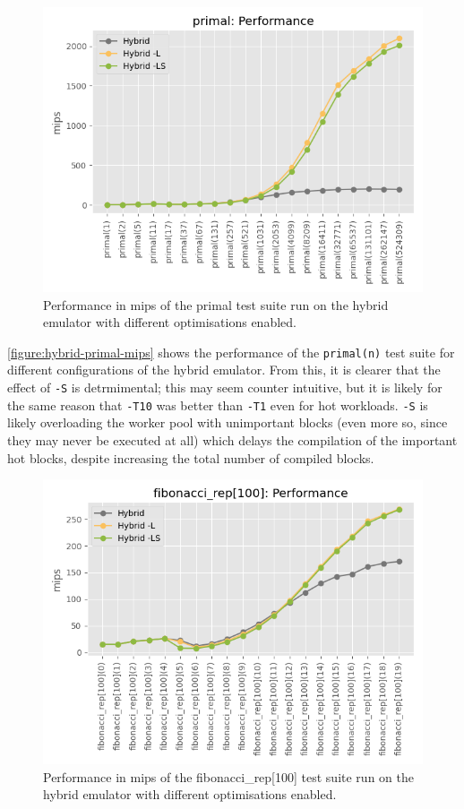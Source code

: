 \begin{figure}[H]
    \centering
    \includegraphics[scale=0.75]{output/graphs/tests/hybrid/primal/mips.png}
    \caption{Performance in mips of the primal test suite run on the hybrid emulator with different optimisations enabled.}
    \label{figure:hybrid-primal-mips}
\end{figure}

\autoref{figure:hybrid-primal-mips} shows the performance of the \texttt{primal(n)} test suite for different configurations of the hybrid emulator. From this, it is clearer that the effect of \texttt{-S} is detrmimental; this may seem counter intuitive, but it is likely for the same reason that \texttt{-T10} was better than \texttt{-T1} even for hot workloads. \texttt{-S} is likely overloading the worker pool with unimportant blocks (even more so, since they may never be executed at all) which delays the compilation of the important hot blocks, despite increasing the total number of compiled blocks.

\begin{figure}[H]
    \centering
    \includegraphics[scale=0.75]{output/graphs/tests/hybrid/fibonacci_rep[100]/mips.png}
    \caption{Performance in mips of the fibonacci\_rep[100] test suite run on the hybrid emulator with different optimisations enabled.}
    \label{figure:hybrid-fibonacci-100-mips}
\end{figure}

